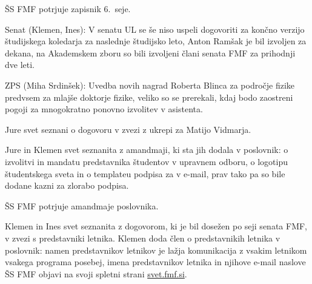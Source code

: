 \documentclass{seja}
\begin{document}
\begin{ad}
\item
\begin{sklep*}
  ŠS FMF potrjuje zapisnik 6.~seje.
\end{sklep*}

\item
Senat (Klemen, Ines): V senatu UL se še niso uspeli dogovoriti za končno verzijo študijskega koledarja za naslednje študijsko leto, Anton Ramšak je bil izvoljen za dekana, na Akademskem zboru so bili izvoljeni člani senata FMF za prihodnji dve leti.

ZPS (Miha Srdinšek): Uvedba novih nagrad Roberta Blinca za področje fizike predvsem za mlajše doktorje fizike, veliko so se prerekali, kdaj bodo zaostreni pogoji za mnogokratno ponovno izvolitev v asistenta.

\item
Jure svet seznani o dogovoru v zvezi z ukrepi za Matijo Vidmarja.

\item
Jure in Klemen svet seznanita z amandmaji, ki sta jih dodala v poslovnik: o izvolitvi in mandatu predstavnika študentov v upravnem odboru, o logotipu študentskega sveta in o templateu podpisa za v e-mail, prav tako pa so bile dodane kazni za zlorabo podpisa.
\begin{sklep*}
    ŠS FMF potrjuje amandmaje poslovnika.
\end{sklep*}

\item
Klemen in Ines svet seznanita z dogovorom, ki je bil dosežen po seji senata FMF, v zvezi s predstavniki letnika. Klemen doda člen o predstavnikih letnika v poslovnik: namen predstavnikov letnikov je lažja komunikacija z vsakim letnikom vsakega programa posebej, imena predstavnikov letnika in njihove e-mail naslove ŠS FMF objavi na svoji spletni strani \url{svet.fmf.si}.


\end{ad}
\end{document}
